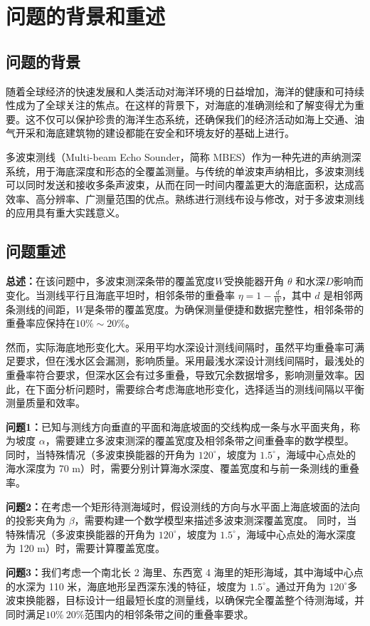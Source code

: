 \documentclass{cumcmthesis}
\begin{document}
\section{问题的背景和重述}
\subsection{问题的背景}
随着全球经济的快速发展和人类活动对海洋环境的日益增加，海洋的健康和可持续性成为了全球关注的焦点。在这样的背景下，对海底的准确测绘和了解变得尤为重要。这不仅可以保护珍贵的海洋生态系统，还确保我们的经济活动如海上交通、油气开采和海底建筑物的建设都能在安全和环境友好的基础上进行。

多波束测线（Multi-beam Echo Sounder，简称 MBES）作为一种先进的声纳测深系统，用于海底深度和形态的全覆盖测量。\cite{ref1}与传统的单波束声纳相比，多波束测线可以同时发送和接收多条声波束，从而在同一时间内覆盖更大的海底面积，达成高效率、高分辨率、广测量范围的优点。熟练进行测线布设与修改，对于多波束测线的应用具有重大实践意义。\cite{ref2}
\subsection{问题重述}
\textbf{总述：}在该问题中，多波束测深条带的覆盖宽度$W$受换能器开角 $\theta$ 和水深$D$影响而变化。当测线平行且海底平坦时，相邻条带的重叠率 $\eta = 1 - \frac dW$，其中 $d$ 是相邻两条测线的间距，$W$是条带的覆盖宽度。为确保测量便捷和数据完整性，相邻条带的重叠率应保持在$10\% \sim 20\%$。

然而，实际海底地形变化大。采用平均水深设计测线间隔时，虽然平均重叠率可满足要求，但在浅水区会漏测，影响质量。采用最浅水深设计测线间隔时，最浅处的重叠率符合要求，但深水区会有过多重叠，导致冗余数据增多，影响测量效率。因此，在下面分析问题时，需要综合考虑海底地形变化，选择适当的测线间隔以平衡测量质量和效率。

\textbf{问题1：}已知与测线方向垂直的平面和海底坡面的交线构成一条与水平面夹角，称为坡度 $\alpha$，需要建立多波束测深的覆盖宽度及相邻条带之间重叠率的数学模型。
同时，当特殊情况（多波束换能器的开角为 $120^\circ$，坡度为 $1.5^\circ$，海域中心点处的海水深度为 70 m）时，需要分别计算海水深度、覆盖宽度和与前一条测线的重叠率。

\textbf{问题2：}在考虑一个矩形待测海域时，假设测线的方向与水平面上海底坡面的法向的投影夹角为 $\beta$，需要构建一个数学模型来描述多波束测深覆盖宽度。
同时，当特殊情况（多波束换能器的开角为 $120^\circ$，坡度为 $1.5^\circ$，海域中心点处的海水深度为 120 m）时，需要计算覆盖宽度。

\textbf{问题3：}我们考虑一个南北长 2 海里、东西宽 4 海里的矩形海域，其中海域中心点的水深为 110 米，海底地形呈西深东浅的特征，坡度为 $1.5^\circ$。通过开角为 $120^\circ$多波束换能器，目标设计一组最短长度的测量线，以确保完全覆盖整个待测海域，并同时满足$10\%~20\%$范围内的相邻条带之间的重叠率要求。
\end{document}
